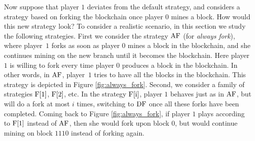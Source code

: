 Now suppose that player $1$ deviates from the default strategy, and considers a strategy based on forking the blockchain once player $0$ mines a block. 
How would this new strategy look? To consider a realistic scenario, in this section we study the following strategies. 
%
%
First we consider the strategy $\text{\rm AF}$ (for \emph{always fork}), where player~$1$ forks as soon as player $0$ mines a block in the blockchain, and she continues mining on the new branch until it becomes the blockchain. Here player $1$ is willing to fork every time player $0$ produces a block in the blockchain. In other words, 
in $\text{\rm AF}$, player~$1$ tries to have all the blocks in the blockchain. This strategy is depicted in Figure \ref{fig:always_fork}.
Second, we consider a family of strategies $\text{\rm F[{1}]}$, $\text{\rm F[{2}]}$, etc. In the strategy $\text{\rm F[{i}]}$, player $1$ behaves just as in $\text{\rm AF}$, but will do a fork at most $i$ times, %
switching to $\text{\rm DF}$ once 
all these forks have been completed. Coming back to Figure \ref{fig:always_fork}, if player $1$ plays according to $\text{\rm F[{1}]}$ instead of $\text{\rm AF}$, then she would fork upon block $0$, but 
would continue mining on block $1110$ instead of forking again. 

